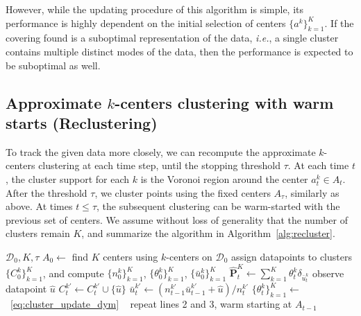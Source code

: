 \documentclass[12pt]{article}
\newcommand{\bnote}[1]{\textcolor{purple}{\textbf{[B: #1]}}}
\newcommand{\ie}{{\it i.e.}}
\newcommand{\RC}[1]{\textcolor{black}{#1}}
\newcommand{\RC}[1]{\textcolor{blue}{#1}}
\begin{document}
However, while the updating procedure of this algorithm is simple, its performance is highly dependent on the initial selection of centers $\{a^k\}_{k=1}^K$. If the covering found is a suboptimal representation of the data, \ie, a single cluster contains multiple distinct modes of the data, then the performance is expected to be suboptimal as well. 
\fi



\subsection{Approximate $k$-centers clustering with warm starts (Reclustering)}
\ifpreprint
To track the given data more closely, we can recompute the approximate $k$-centers clustering at each time step, until the stopping threshold $\tau$.
At each time $t$, the cluster support for each $k$ is the Voronoi region around the center $a_t^k \in A_t$.
After the threshold $\tau$, we cluster points using the fixed centers $A_\tau$, similarly as above. 
At times $t\leq \tau $, the subsequent clustering can be warm-started with the previous set of centers. We assume without loss of generality that the number of clusters remain $K$, and summarize the algorithm in Algorithm~\ref{alg:recluster}. 
\begin{algorithm}[ht]
	\caption{Reclustering}
	\label{alg:recluster}
	\begin{algorithmic}[1]
	  $\mathcal{D}_0, K,\tau$ 
     \State $A_0 \gets$ find $K$ centers using $k$-centers on $\mathcal{D}_0$
     \State assign datapoints to clusters $\{C^k_0\}_{k=1}^K$, and compute $\{n^k_0\}_{k=1}^K$, $\{\theta^k_0\}_{k=1}^K$, $\{\bar{u}_0^k\}_{k=1}^K$
\State  $\hat{\mathbf{P}}^K_t \gets \sum_{k=1}^{K}\theta_t^k\delta_{\bar{u}_t^k}$
\State observe datapoint $\hat{u}$
\State $C_t^{k'} \gets C_t^{k'} \cup \{\hat{u}\}$ 
     \State $\bar{u}^{k'}_t \gets (n^{k'}_{t-1}\bar{u}^{k'}_{t-1} + \hat{u})/n^{k'}_t$ \Comment{update \RC{mean}}
     \State $\{\theta^k_t\}_{k=1}^K \gets$~\eqref{eq:cluster_update_dym} 
\Else~
    repeat lines 2 and 3, warm starting at $A_{t-1}$
    \EndIf
  \EndFor
	\end{algorithmic}
\end{algorithm} 
\end{document}
